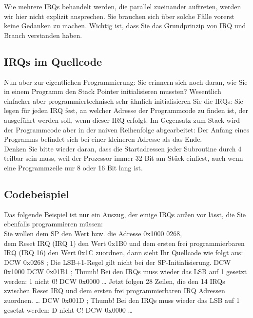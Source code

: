 Wie mehrere IRQs behandelt werden, die parallel zueinander auftreten, werden wir hier nicht explizit ansprechen. Sie brauchen sich über solche Fälle vorerst keine Gedanken zu machen. Wichtig ist, dass Sie das Grundprinzip von IRQ und Branch verstanden haben.

\subsection{IRQs im Quellcode}

Nun aber zur eigentlichen Programmierung: Sie erinnern sich noch daran, wie Sie in einem Programm den Stack Pointer initialisieren mussten? Wesentlich einfacher aber programmiertechnisch sehr ähnlich initialisieren Sie die IRQs: Sie legen für jeden IRQ fest, an welcher Adresse der Programmcode zu finden ist, der ausgeführt werden soll, wenn dieser IRQ erfolgt. Im Gegensatz zum Stack wird der Programmcode aber in der naiven Reihenfolge abgearbeitet: Der Anfang eines Programms befindet sich bei einer kleineren Adresse als das Ende.\\

Denken Sie bitte wieder daran, dass die Startadressen jeder Subroutine durch 4 teilbar sein muss, weil der Prozessor immer 32 Bit am Stück einliest, auch wenn eine Programmzeile nur 8 oder 16 Bit lang ist.

\subsection{Codebeispiel}

Das folgende Beispiel ist nur ein Auszug, der einige IRQs außen vor lässt, die Sie ebenfalls programmieren müssen:\\

Sie wollen dem
SP den Wert bzw. die Adresse 0x1000 0268, \\
dem Reset IRQ (IRQ 1) den Wert 0x1B0 und 
dem ersten frei programmierbaren IRQ (IRQ 16) den Wert 0x1C
zuordnen, dann sieht Ihr Quellcode wie folgt aus:\\

DCW	0x0268		; Die LSB+1-Regel gilt nicht bei der SP-Initialisierung.
DCW	0x1000
DCW	0x01B1		; Thumb! Bei den IRQs muss wieder das LSB auf 1 gesetzt werden: 1 nicht 0!
DCW	0x0000
… 
Jetzt folgen 28 Zeilen, die den 14 IRQs zwischen Reset IRQ und dem ersten frei programmierbaren IRQ Adressen zuordnen.
…
DCW 	0x001D		; Thumb! Bei den IRQs muss wieder das LSB auf 1 gesetzt werden: D nicht C!
DCW	0x0000
…\\

